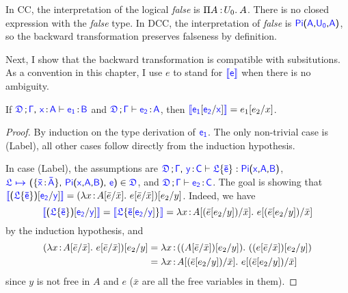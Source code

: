 In CC, the interpretation of the logical \textit{false} is $\Pi A\mkern1.5mu{\hspace{0.5mm}{:}\hspace{0.5mm}} U_0.\hspace{0.8mm}A$. There is no closed expression with the \textit{false} type. In DCC, the interpretation of \textit{false} is $\targetpi{A}{U_0}{A}$, so the backward transformation preserves falseness by definition. 

Next, I show that the backward transformation is compatible with subsitutions. As a convention in this chapter, I use $e$ to stand for $\bluebr{\target{e}}$ when there is no ambiguity.

\begin{lemma} If $\targetcon \sfcomma \itemtype{x}{A} \vdash \itemtype{e_1}{B}$ and $\targetcon \vdash \itemtype{e_2}{A}$, then $\bluebr{\target{e_1}\targetsub{e_2}{x}} = e_1\sub{e_2}{x}$.
\begin{proof}
By induction on the type derivation of $\target{e_1}$. The only non-trivial case is (Label), all other cases follow directly from the induction hypothesis.

In case (Label), the assumptions are $\targetcon \sfcomma \itemtype{y}{C} \vdash \targetlab{\flabel}{\bar{e}} : \targetpi{x}{A}{B}$,
$\itemdef{\target{\flabel}}{\itemtype{\bar{x}}{\bar{A}}}{\targetpi{x}{A}{B}}{\target{e}} \in \target{\fdef}$, 
and $\targetcon \vdash \itemtype{e_2}{C}$. The goal is showing that 
$ \bluebr{\sfpl \targetlab{\flabel}{\bar{e}} \sfpr \targetsub{e_2}{y}} = (\lam{x}{A\sub{\bar{e}}{\bar{x}}}{e\sub{\bar{e}}{\bar{x}}})\sub{e_2}{y}$. Indeed, we have
\begin{equation*}
	\bluebr{\sfpl \targetlab{\flabel}{\bar{e}} \sfpr \targetsub{e_2}{y}} = 
	\bluebr{\target{\flabel}\{\target{\bar{e}}\targetsub{e_2}{y}\}}\\
	= \lam{x}{A\sub{(\bar{e}\sub{e_2}{y})}{\bar{x}}}{e\sub{(\bar{e}\sub{e_2}{y})}{\bar{x}}}
\end{equation*}
by the induction hypothesis, and
\begin{align*}
	(\lambda x\hspace{0.5mm}{:}\hspace{0.5mm} A[\bar{e}\slash\bar{x}].\ e[\bar{e}\slash\bar{x}])[e_2\slash y] &= 
	\lambda x\hspace{0.5mm}{:}\hspace{0.5mm}((A[\bar{e}\slash\bar{x}]) [e_2\slash y]).\ ((e[\bar{e}\slash\bar{x}])[e_2\slash y])\\
	&= \lambda x\hspace{0.5mm}{:}\hspace{0.5mm} A[(\bar{e}[e_2\slash y])\slash\bar{x}].\ e[(\bar{e}[e_2\slash y])\slash\bar{x}]
\end{align*}
since $y$ is not free in $A$ and $e$ ($\bar{x}$ are all the free variables in them).
\end{proof}
\end{lemma}

